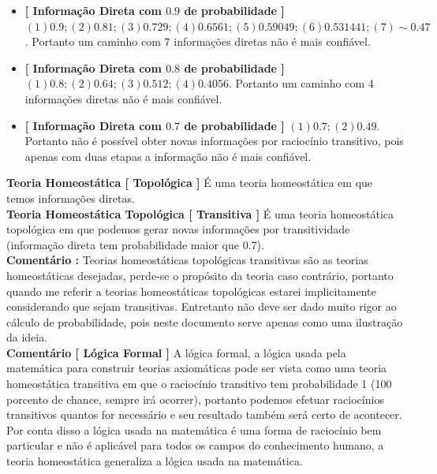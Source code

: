\documentclass[10pt,a4paper]{report}
\begin{document}
\begin{itemize}
	\item[ (i) ] \textbf{[ Informação Direta com $0.9$ de probabilidade ]} $ (1)0.9 ; (2)0.81 ; (3)0.729; (4)0.6561; (5)0.59049 ; (6)0.531441 ; (7)\sim0.47 $. Portanto um caminho com 7 informações diretas não é mais confiável.
	\item[ (ii) ] \textbf{[ Informação Direta com $0.8$ de probabilidade ]} $ (1)0.8 ; (2)0.64; (3)0.512; (4)0.4056 $. Portanto um caminho com 4 informações diretas não é mais confiável.
	\item[ (iii) ] \textbf{[ Informação Direta com $0.7$ de probabilidade ]} $ (1)0.7; (2)0.49 $. Portanto não é possível obter novas informações por raciocínio transitivo, pois apenas com duas etapas a informação não é mais confiável.
\end{itemize}


\textbf{Teoria Homeostática [ Topológica ]} É uma teoria homeostática em que temos informações diretas.\\

\textbf{Teoria Homeostática Topológica [ Transitiva ]} É uma teoria homeostática topológica em que podemos gerar novas informações por transitividade (informação direta tem probabilidade maior que 0.7).\\

\textbf{Comentário :} Teorias homeostáticas topológicas transitivas são as teorias homeostáticas desejadas, perde-se o propósito da teoria caso contrário, portanto quando me referir a teorias homeostáticas topológicas estarei implicitamente considerando que sejam transitivas. Entretanto não deve ser dado muito rigor ao cálculo de probabilidade, pois neste documento serve apenas como uma ilustração da ideia.\\

\textbf{Comentário [ Lógica Formal ]} A lógica formal, a lógica usada pela matemática para construir teorias axiomáticas pode ser vista como uma teoria homeostática transitiva em que o raciocínio transitivo tem probabilidade 1 (100 porcento de chance, sempre irá ocorrer), portanto podemos efetuar raciocínios transitivos quantos for necessário e seu resultado também será certo de acontecer. Por conta disso a lógica usada na matemática é uma forma de raciocínio bem particular e não é aplicável para todos os campos do conhecimento humano, a teoria homeostática generaliza a lógica usada na matemática.
\end{document}
